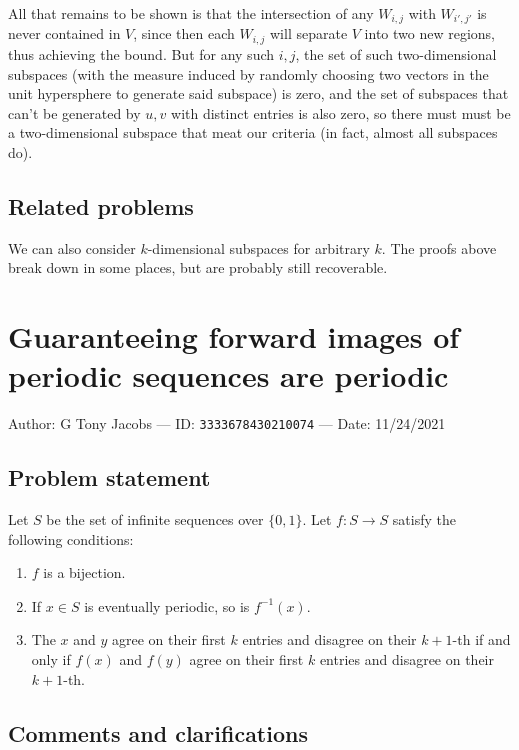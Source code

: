 \documentclass[10pt]{article}
\begin{document}
All that remains to be shown is that the intersection of any $W_{i,j}$ with $W_{i',j'}$ is never contained in $V$, since then each $W_{i,j}$ will separate $V$ into two new regions, thus achieving the bound. But for any such $i,j$, the set of such two-dimensional subspaces (with the measure induced by randomly choosing two vectors in the unit hypersphere to generate said subspace) is zero, and the set of subspaces that can't be generated by $u,v$ with distinct entries is also zero, so there must must be a two-dimensional subspace that meat our criteria (in fact, almost all subspaces do).

\subsection{Related problems}

We can also consider $k$-dimensional subspaces for arbitrary $k$. The proofs above break down in some places, but are probably still recoverable.

\pagebreak

\section{Guaranteeing forward images of periodic sequences are periodic}

Author: G Tony Jacobs --- ID: \verb`3333678430210074` --- Date: 11/24/2021

\subsection{Problem statement}

Let $S$ be the set of infinite sequences over $\{0,1\}$. Let $f:S\to S$ satisfy the following conditions:

\begin{enumerate}
  \item $f$ is a bijection.
  \item If $x\in S$ is eventually periodic, so is $f^{-1}(x)$.
  \item The $x$ and $y$ agree on their first $k$ entries and disagree on their $k+1$-th if and only if $f(x)$ and $f(y)$ agree on their first $k$ entries and disagree on their $k+1$-th.
\end{enumerate}

\subsection{Comments and clarifications}
\end{document}
